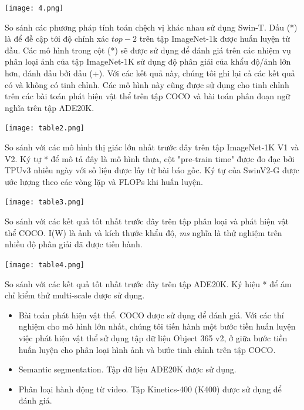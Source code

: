 \documentclass[times, twocolumn]{zHenriquesLab-StyleBioRxiv}
\begin{document}
\begin{onecolumn}
    \begin{table}[!ht] %
        \centering
        \texttt{[image: 4.png]}
        \caption{So sánh các phương pháp tính toán chệch vị khác nhau sử dụng Swin-T. Dấu (*) là để đề cập tới độ chính xác $top-2$ trên tập ImageNet-1k được huấn luyện từ đầu. Các mô hình trong cột (*) sẽ được sử dụng để đánh giá trên các nhiệm vụ phân loại ảnh của tập ImageNet-1K sử dụng độ phân giải của khẩu độ/ảnh lớn hơn, đánh dấu bởi dấu (+). Với các kết quả này, chúng tôi ghi lại cả các kết quả có và không có tinh chỉnh. Các mô hình này cũng được sử dụng cho tinh chỉnh trên các bài toán phát hiện vật thể trên tập COCO và bài toán phân đoạn ngữ nghĩa trên tập ADE20K.}
    \end{table}

    \vspace{5mm}

    \begin{table}[!ht]
        \centering
        \texttt{[image: table2.png]}
        \caption{So sánh với các mô hình thị giác lớn nhất trước đây trên tập ImageNet-1K V1 và V2. Ký tự * để mô tả đây là mô hình thưa, cột "pre-train time" được đo đạc bởi TPUv3 nhiều ngày với số liệu được lấy từ bài báo gốc. Ký tự \dag của SwinV2-G được ước lượng theo các vòng lặp và FLOPs khi huấn luyện.}
    \end{table}

    \begin{table}
        \parbox{.45\linewidth}{
            \centering
            \texttt{[image: table3.png]}
            \caption{So sánh với các kết quả tốt nhất trước đây trên tập phân loại và phát hiện vật thể COCO. I(W) là ảnh và kích thước khẩu độ, \textit{ms} nghĩa là thử nghiệm trên nhiều độ phân giải đã được tiến hành.}
        }
        \hfill
        \parbox{.45\linewidth}{
            \centering
            \texttt{[image: table4.png]}
            \caption{So sánh với các kết quả tốt nhất trước đây trên tập ADE20K. Ký hiệu * để ám chỉ kiểm thử multi-scale được sử dụng.}
        }
        \vspace{10mm}
    \end{table}

\end{onecolumn}

\twocolumn

\begin{itemize}
    \item Bài toán phát hiện vật thể. COCO được sử dụng để đánh giá. Với các thí nghiệm cho mô hình lớn nhất, chúng tôi tiến hành một bước tiền huấn luyện việc phát hiện vật thể sử dụng tập dữ liệu Object 365 v2, ở giữa bước tiền huấn luyện cho phân loại hình ảnh và bước tinh chỉnh trên tập COCO.
    \item Semantic segmentation. Tập dữ liệu ADE20K được sử dụng.
    \item Phân loại hành động từ video. Tập Kinetics-400 (K400) được sử dụng để đánh giá.
\end{itemize}
\end{document}
